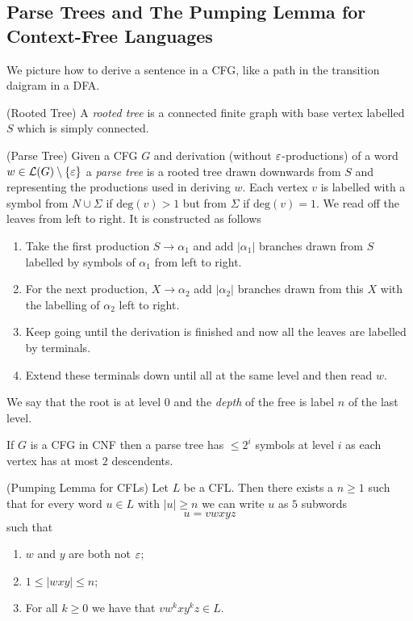 \documentclass[tikx, border = 10pt]{article}
\begin{document}
\subsection{Parse Trees and The Pumping Lemma for Context-Free Languages}
We picture how to derive a sentence in a CFG, like a path in the transition daigram in a DFA.
\begin{definition}
	(Rooted Tree) A \textit{rooted tree} is a connected finite graph with base vertex labelled $ S $ which is simply connected.
\end{definition}
\begin{definition}
	(Parse Tree) Given a CFG $ G $ and derivation (without $ \varepsilon $-productions) of a word $ w\in\mathcal L(G) \setminus \{\varepsilon\} $ a \textit{parse tree} is a rooted tree drawn downwards from $ S $ and representing the productions used in deriving $ w $. Each vertex $ v $ is labelled with a symbol from $ N\cup \Sigma $ if $ \mathrm{deg}(v) > 1 $ but from $ \Sigma $ if $ \mathrm{deg}(v) = 1 $. We read off the leaves from left to right. It is constructed as follows
	\begin{enumerate}
		\item Take the first production $ S\to \alpha_1 $ and add $ |\alpha_1| $ branches drawn from $ S $ labelled by symbols of $ \alpha_1 $ from left to right.
		\item For the next production, $ X\to\alpha_2 $ add $ |\alpha_2| $ branches drawn from this $ X $ with the labelling of $ \alpha_2 $ left to right.
		\item Keep going until the derivation is finished and now all the leaves are labelled by terminals.
		\item Extend these terminals down until all at the same level and then read $ w $.
	\end{enumerate}
\end{definition}
We say that the root is at level $ 0 $ and the \textit{depth} of the free is label $ n $ of the last level.
\begin{remark}
  If $ G $ is a CFG in CNF then a parse tree has $ \le 2^i $ symbols at level $ i $ as each vertex has at most $ 2 $ descendents. 
\end{remark}
\begin{theorem}
	(Pumping Lemma for CFLs) Let $ L $ be a CFL. Then there exists a $ n\ge 1 $ such that for every word $ u\in L $ with $ |u| \ge n $ we can write $ u $ as $ 5 $ subwords
	\[
	  u = vwxyz
	\]
	such that
	\begin{enumerate}
		\item $ w $ and $ y $ are both not $ \varepsilon $;
		\item $ 1\le |wxy| \le n $;
		\item For all $ k\ge 0 $ we have that $ vw^kxy^kz\in L $.
	\end{enumerate}
\end{theorem}
\end{document}
